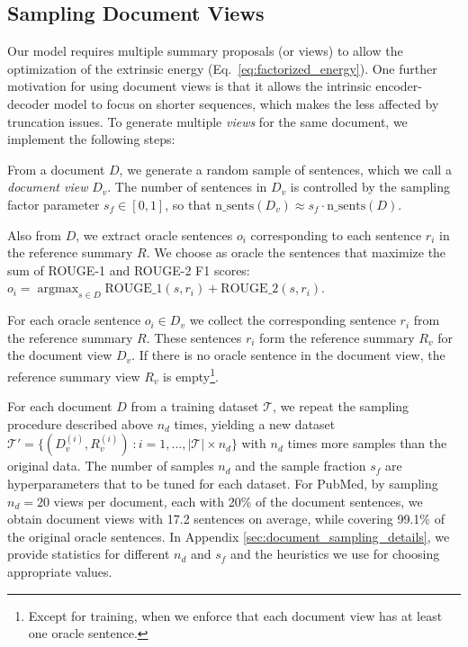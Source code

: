 \documentclass[11pt,table]{article}
\newenvironment{itemizesquish}[2]{\begin{list}{\labelitemi}{\setlength{\itemsep}{#1}\setlength{\labelwidth}{#2}\setlength{\leftmargin}{\labelwidth}\addtolength{\leftmargin}{\labelsep}}}{\end{list}}
\begin{document}
\subsection{Sampling Document Views}
\label{sec:sampling_document_views}
Our model requires multiple summary proposals (or views) to allow the optimization of the extrinsic energy (Eq.~\ref{eq:factorized_energy}). One further motivation for using document views is that it allows the intrinsic encoder-decoder model to focus on shorter sequences, which makes the less affected by truncation issues. To generate multiple \emph{views} for the same document, we implement the following steps:
\begin{itemizesquish}{-0.3em}{0.5em}
    \item From a document $D$, we generate a random sample of sentences, which we call a \emph{document view} $D_v$. The number of sentences in $D_v$ is controlled by the sampling factor parameter $s_f \in [0,1]$, so that $\mathrm{n\_sents}(D_v) \approx s_f \cdot \mathrm{n\_sents}(D)$.
    \item Also from $D$, we extract oracle sentences $o_i$ corresponding to each sentence $r_i$ in the reference summary $R$. We choose as oracle the sentences that maximize the sum of ROUGE-1 and ROUGE-2 F1 scores: $o_i = \operatorname*{argmax}_{s \in D} \mathrm{ROUGE\text{\_}1}(s, r_i) + \mathrm{ROUGE\text{\_}2}(s, r_i)$.
    \item For each oracle sentence $o_i \in D_v$ we collect the corresponding sentence $r_i$ from the reference summary $R$. These sentences $r_i$ form the reference summary $R_v$ for the document view $D_v$. If there is no oracle sentence in the document view, the reference summary view $R_v$ is empty\footnote{Except for training, when we enforce that each document view has at least one oracle sentence.}.
\end{itemizesquish}
For each document $D$ from a training dataset $\mathcal{T}$, we repeat the sampling procedure described above $n_d$ times, yielding a new dataset $\mathcal{T'} = \{(D_v^{(i)}, R_v^{(i)})\ : i = 1, \ldots, | \mathcal{T}| \times n_d\}$ with $n_d$ times more samples than the original data. The number of samples $n_d$ and the sample fraction $s_f$ are hyperparameters that to be tuned for each dataset. For PubMed, by sampling $n_d=20$ views per document, each with 20\% of the document sentences, we obtain document views with 17.2 sentences on average, while covering 99.1\% of the original oracle sentences. In Appendix \ref{sec:document_sampling_details}, we provide statistics for different $n_d$ and $s_f$ and the heuristics we use for choosing appropriate values.
\end{document}
